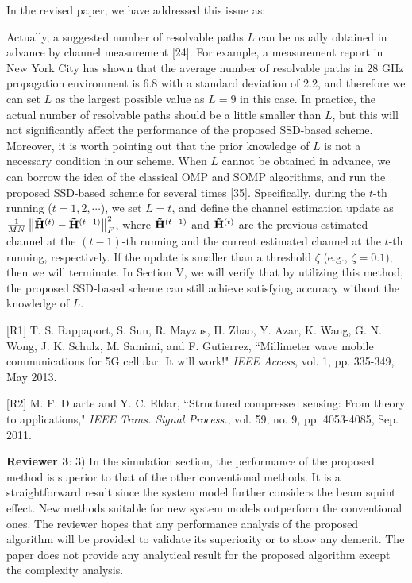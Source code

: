 \documentclass[a4paper,12pt]{article}
\begin{document}
{In the revised paper, we have addressed this issue as:
\begin{framed}
{\color{red} Actually, a suggested number of resolvable paths ${L}$ can be usually obtained in advance by channel measurement [24]. For example, a measurement report in New York City has shown that the average number of resolvable paths in 28 GHz propagation environment is 6.8 with a standard deviation of 2.2, and therefore we can set ${L}$ as the largest possible value as ${L = 9}$ in this case. In practice, the actual number of resolvable paths should be a little smaller than ${L}$, but this will not significantly affect the performance of the proposed SSD-based scheme. Moreover, it is worth pointing out that the prior knowledge of ${L}$ is not a necessary condition in our scheme. When ${L}$ cannot be obtained in advance, we can borrow the idea of the classical OMP and SOMP algorithms, and run the proposed SSD-based scheme for several times [35]. Specifically, during the ${t}$-th running (${t = 1,2, \cdots }$), we set ${L = t}$, and define the channel estimation update as ${\frac{1}{{MN}}\left\| {{{{\bf{\tilde H}}}^{\left( t \right)}} - {{{\bf{\tilde H}}}^{\left( {t - 1} \right)}}} \right\|_F^2}$, where ${{{{{\bf{\tilde H}}}^{\left( {t - 1} \right)}}}}$ and ${{{{{\bf{\tilde H}}}^{\left( t \right)}}}}$ are the previous estimated channel at the ${\left( {t - 1} \right)}$-th running and the current estimated channel at the ${t}$-th running, respectively. If the update is smaller than a threshold ${\zeta }$ (e.g., ${\zeta = 0.1}$), then we will terminate. In Section V, we will verify that by utilizing this method, the proposed SSD-based scheme can still achieve satisfying accuracy without the knowledge of ${L}$.}
\end{framed}




[R1] T. S. Rappaport, S. Sun, R. Mayzus, H. Zhao, Y. Azar, K. Wang, G. N. Wong, J. K. Schulz, M. Samimi, and F. Gutierrez, ``Millimeter wave mobile communications for 5G cellular: It will work!" {\it IEEE Access}, vol. 1, pp. 335-349, May 2013.

[R2] M. F. Duarte and Y. C. Eldar, ``Structured compressed sensing: From theory to applications," {\it IEEE Trans. Signal Process.}, vol. 59, no. 9, pp. 4053-4085, Sep. 2011.
}

\textbf{Reviewer 3}: 3) In the simulation section, the performance of the proposed method is superior to that of the other conventional methods. It is a straightforward result since the system model further considers the beam squint effect. New methods suitable for new system models outperform the conventional ones. The reviewer hopes that any performance analysis of the proposed algorithm will be provided to validate its superiority or to show any demerit. The paper does not provide any analytical result for the proposed algorithm except the complexity analysis.
\end{document}
